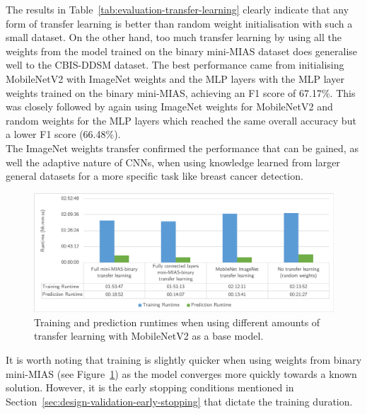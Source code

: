 

The results in Table~\ref{tab:evaluation-transfer-learning} clearly indicate that any form of transfer learning is better than random weight initialisation with such a small dataset. On the other hand, too much transfer learning by using all the weights from the model trained on the binary mini-MIAS dataset does generalise well to the CBIS-DDSM dataset. The best performance came from initialising MobileNetV2 with ImageNet weights and the MLP layers with the MLP layer weights trained on the binary mini-MIAS, achieving an F1 score of 67.17\%. This was closely followed by again using ImageNet weights for MobileNetV2 and random weights for the MLP layers which reached the same overall accuracy but a lower F1 score (66.48\%).\\

The ImageNet weights transfer confirmed the performance that can be gained, as well the adaptive nature of CNNs, when using knowledge learned from larger general datasets for a more specific task like breast cancer detection.

\begin{figure}[h]
\centerline{\includegraphics[width=\textwidth]{figures/evaluation/transfer_learning_experiment/runtimes.png}}
\caption{\label{fig:evaluation-transfer_learning_experiment-runtimes}Training and prediction runtimes when using different amounts of transfer learning with MobileNetV2 as a base model.}
\end{figure}

It is worth noting that training is slightly quicker when using weights from binary mini-MIAS (see Figure~\ref{fig:evaluation-transfer_learning_experiment-runtimes}) as the model converges more quickly towards a known solution. However, it is the early stopping conditions mentioned in Section~\ref{sec:design-validation-early-stopping} that dictate the training duration.



